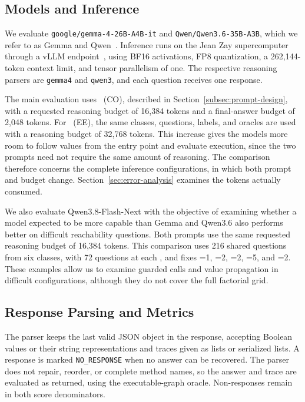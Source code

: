 \subsection{Models and Inference}
\label{subsec:model-configurations}

We evaluate \texttt{google/gemma-4-26B-A4B-it} and \texttt{Qwen/Qwen3.6-35B-A3B}, which we refer to as Gemma and Qwen~\cite{google2026gemma4,qwen2026qwen36}. Inference runs on the Jean Zay supercomputer through a vLLM endpoint~\cite{kwon2023vllm}, using BF16 activations, FP8 quantization, a 262,144-token context limit, and tensor parallelism of one. The respective reasoning parsers are \texttt{gemma4} and \texttt{qwen3}, and each question receives one response.

The main evaluation uses \benchmark~(CO), described in Section~\ref{subsec:prompt-design}, with a requested reasoning budget of 16,384 tokens and a final-answer budget of 2,048 tokens. For \benchmark~(EE), the same classes, questions, labels, and oracles are used with a reasoning budget of 32,768 tokens. This increase gives the models more room to follow values from the entry point and evaluate execution, since the two prompts need not require the same amount of reasoning. The comparison therefore concerns the complete inference configurations, in which both prompt and budget change. Section~\ref{sec:error-analysis} examines the tokens actually consumed.

We also evaluate Qwen3.8-Flash-Next with the objective of examining whether a model expected to be more capable than Gemma and Qwen3.6 also performs better on difficult reachability questions. Both prompts use the same requested reasoning budget of 16,384 tokens. This comparison uses 216 shared questions from six classes, with 72 questions at each , and fixes =1, =2, =2, =5, and =2. These examples allow us to examine guarded calls and value propagation in difficult configurations, although they do not cover the full factorial grid.

\subsection{Response Parsing and Metrics}
\label{subsec:parsing}
\label{subsec:scoring}
\label{subsec:statistical-analysis}

The parser keeps the last valid JSON object in the response, accepting Boolean values or their string representations and traces given as lists or serialized lists. A response is marked \texttt{NO\_RESPONSE} when no answer can be recovered. The parser does not repair, reorder, or complete method names, so the answer and trace are evaluated as returned, using the executable-graph oracle. Non-responses remain in both score denominators.

